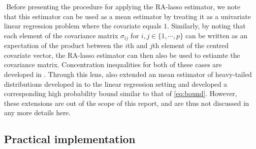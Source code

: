 $ $\newline
Before presenting the procedure for applying the RA-lasso estimator, we note that this estimator can be used as a mean estimator by treating it as a univariate linear regression problem where the covariate equals $1$. Similarly, by noting that each element of the covariance matrix $\sigma_{ij}$ for $i,j\in\{1,\cdots,p\}$ can be written as an expectation of the product between the $i$th and $j$th element of the centred covariate vector, the RA-lasso estimator can then also be used to estiamte the covariance matrix. Concentration inequalities for both of these cases are developed in \citet{fan2017estimation}. Through this lens, \citet{fan2017estimation} also extended an mean estimator of heavy-tailed distributions developed in \citet{catoni2012challenging} to the linear regression setting and developed a corresponding high probability bound similar to that of \cref{eq:bound}. However, these extensions are out of the scope of this report, and are thus not discussed in any more details here.

\subsection{Practical implementation}

